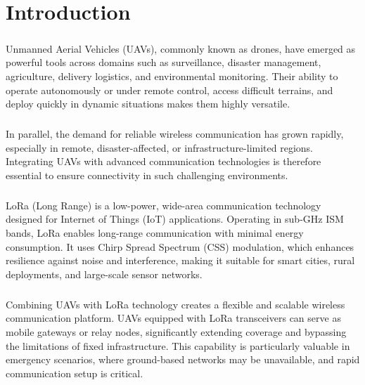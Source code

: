 \chapter{Introduction}

\paragraph{}
Unmanned Aerial Vehicles (UAVs), commonly known as drones, have emerged as powerful tools across domains such as surveillance, disaster management, agriculture, delivery logistics, and environmental monitoring. Their ability to operate autonomously or under remote control, access difficult terrains, and deploy quickly in dynamic situations makes them highly versatile.

\paragraph{}
In parallel, the demand for reliable wireless communication has grown rapidly, especially in remote, disaster-affected, or infrastructure-limited regions. Integrating UAVs with advanced communication technologies is therefore essential to ensure connectivity in such challenging environments.

\paragraph{}
LoRa (Long Range) is a low-power, wide-area communication technology designed for Internet of Things (IoT) applications. Operating in sub-GHz ISM bands, LoRa enables long-range communication with minimal energy consumption. It uses Chirp Spread Spectrum (CSS) modulation, which enhances resilience against noise and interference, making it suitable for smart cities, rural deployments, and large-scale sensor networks.

\paragraph{}
Combining UAVs with LoRa technology creates a flexible and scalable wireless communication platform. UAVs equipped with LoRa transceivers can serve as mobile gateways or relay nodes, significantly extending coverage and bypassing the limitations of fixed infrastructure. This capability is particularly valuable in emergency scenarios, where ground-based networks may be unavailable, and rapid communication setup is critical.

